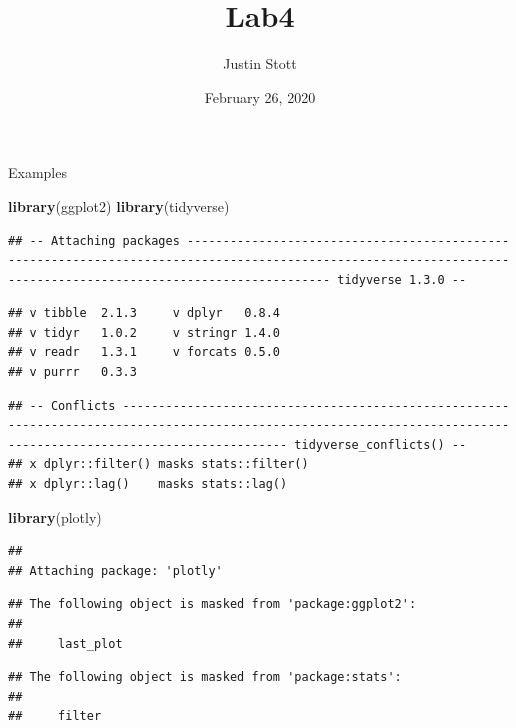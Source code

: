 \documentclass[]{article}
\title{Lab4}
\author{Justin Stott}
\date{February 26, 2020}
\newenvironment{Shaded}{\begin{snugshade}}{\end{snugshade}}
\newcommand{\KeywordTok}[1]{\textcolor[rgb]{0.13,0.29,0.53}{\textbf{#1}}}
\newcommand{\NormalTok}[1]{#1}
\begin{document}
\maketitle

Examples

\begin{Shaded}
\begin{Highlighting}[]
\KeywordTok{library}\NormalTok{(ggplot2)}
\KeywordTok{library}\NormalTok{(tidyverse)}
\end{Highlighting}
\end{Shaded}

\begin{verbatim}
## -- Attaching packages ---------------------------------------------------------------------------------------------------------------------------------------------------------------- tidyverse 1.3.0 --
\end{verbatim}

\begin{verbatim}
## v tibble  2.1.3     v dplyr   0.8.4
## v tidyr   1.0.2     v stringr 1.4.0
## v readr   1.3.1     v forcats 0.5.0
## v purrr   0.3.3
\end{verbatim}

\begin{verbatim}
## -- Conflicts ------------------------------------------------------------------------------------------------------------------------------------------------------------------- tidyverse_conflicts() --
## x dplyr::filter() masks stats::filter()
## x dplyr::lag()    masks stats::lag()
\end{verbatim}

\begin{Shaded}
\begin{Highlighting}[]
\KeywordTok{library}\NormalTok{(plotly)}
\end{Highlighting}
\end{Shaded}

\begin{verbatim}
## 
## Attaching package: 'plotly'
\end{verbatim}

\begin{verbatim}
## The following object is masked from 'package:ggplot2':
## 
##     last_plot
\end{verbatim}

\begin{verbatim}
## The following object is masked from 'package:stats':
## 
##     filter
\end{verbatim}
\end{document}
